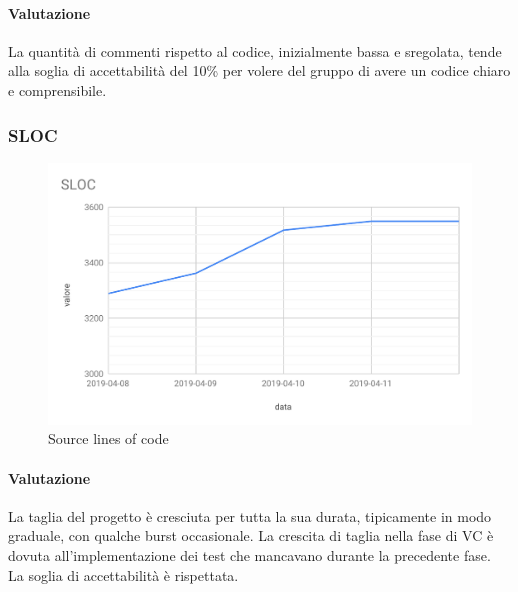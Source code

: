 \paragraph*{Valutazione}
La quantità di commenti rispetto al codice, inizialmente bassa e sregolata, tende alla soglia di accettabilità del 10\% per volere del gruppo di avere un codice chiaro e comprensibile. 





\subsubsection{SLOC}
\begin{figure}[H]
	\centering
	\includegraphics[scale=0.6]{res/images/RA/sloc.pdf}
	\caption{Source lines of code}
\end{figure}
\paragraph*{Valutazione}
La taglia del progetto è cresciuta per tutta la sua durata, tipicamente in modo graduale, con qualche burst occasionale. La crescita di taglia nella fase di VC è dovuta all'implementazione dei test che mancavano durante la precedente fase.\\
La soglia di accettabilità è rispettata.


